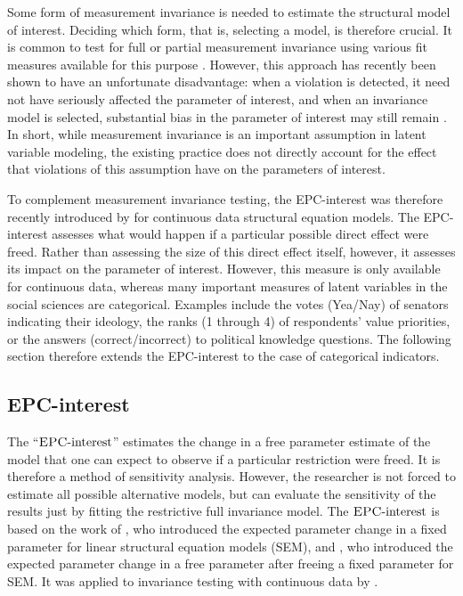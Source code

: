 \documentclass[letterpaper,12pt]{article}
\newcommand{\da}{\textrm{{\sc {EPC}}-interest}}
\begin{document}
Some form of measurement invariance is needed to estimate the structural model of interest. Deciding which form, that is, selecting a model, is therefore crucial. It is common to test for full or partial measurement invariance using various fit measures available for this purpose \citep{byrne1989testing,hu1998fit,cheung2002evaluating,chen2007sensitivity,saris2009testing}. However, this approach has recently been shown to have an unfortunate disadvantage: when a violation is detected, it need not have seriously affected the parameter of interest, and when an invariance model is selected, substantial bias in the parameter of interest may still remain \citep{Oberski:WP:EPC-interest}. In short, while measurement invariance is an important assumption in latent variable modeling, the existing practice does not directly account for the effect that violations of this assumption have on the parameters of interest.

To complement measurement invariance testing, the 
 EPC-interest was therefore recently introduced by \citet{Oberski:WP:EPC-interest} for continuous data structural equation models. The EPC-interest assesses what would happen if a particular possible direct effect were freed. Rather than assessing the size of this direct effect itself, however, it assesses its impact on the parameter of interest. However, this measure is only available for continuous data, whereas many important measures of latent variables in the social sciences are categorical. Examples include the votes (Yea/Nay) of senators indicating their ideology, the ranks (1 through 4) of respondents' value priorities, or the answers (correct/incorrect) to political knowledge questions. The following section therefore extends the EPC-interest to the case of categorical indicators.

\subsection{EPC-interest}
\label{sec:epc-interest}

The ``$\da$'' estimates the change in a free parameter estimate of the model that one can expect to observe if a particular restriction were freed. It is therefore a method of sensitivity analysis. However, the researcher is not forced to estimate all possible alternative models, but can evaluate the sensitivity of the results just by fitting the restrictive full invariance model. 
The $\da{}$ is based on the work of \citet{saris_detection_1987}, who introduced the expected parameter change in a fixed parameter for linear structural equation models (SEM), and \citet{bentler1993some}, who introduced the expected parameter change in a free parameter after freeing a fixed parameter for SEM. It was applied to invariance testing with continuous data by \citet{Oberski:WP:EPC-interest}.
\end{document}
